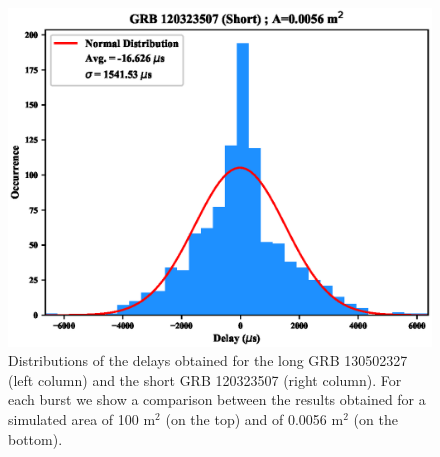 \documentclass[]{spie}  %
\begin{document}
\begin{figure}[h!]
\includegraphics[scale=0.5,angle=0]{fig/distribution_short_56.eps}

\caption{Distributions of the delays obtained for the long GRB 130502327 (left column) and the short GRB 120323507 (right column). For each burst we show a comparison between the results obtained for a simulated area of 100 m$^2$ (on the top) and of 0.0056 m$^2$ (on the bottom).}
\label{fig:centroid_distribution_100_hermes_sample}
\end{figure}
\end{document}
